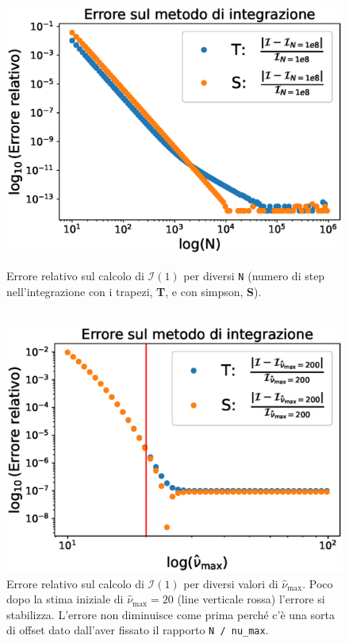 \documentclass[a4paper, titlepage]{article}
\begin{document}
\begin{figure}[h]
    \begin{minipage}{0.49 \textwidth}
        \centering
        \includegraphics[width = \textwidth]{Figures/Pot_cvgN.eps}
        \caption{Errore relativo sul calcolo di $\mathcal I(1)$ per diversi \texttt{N} (numero di step nell'integrazione con i trapezi, \textbf{T}, e con simpson, \textbf{S}).  \\ \\}
        \label{fig:Pot_cvgN}
    \end{minipage}
    \hspace{0.01 \textwidth}
    \begin{minipage}{0.49 \textwidth}
        \centering
        \includegraphics[width = \textwidth]{Figures/Pot_cvgA.eps}
        \caption{Errore relativo sul calcolo di $\mathcal I (1)$ per diversi valori di $\hat \nu_\text{max}$.
        Poco dopo la stima iniziale di  $\hat \nu_\text{max} = \num{20}$ (line verticale rossa) l'errore si stabilizza.
        L'errore non diminuisce come prima perché c'è una sorta di offset dato dall'aver fissato il rapporto \texttt{N / nu\_max}.}
        \label{fig:Pot_cvgA}
    \end{minipage}
\end{figure}
\end{document}
